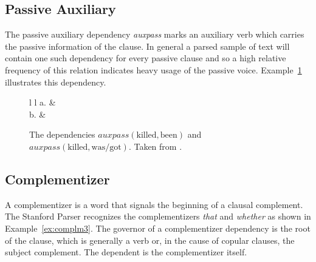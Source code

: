 \documentclass[main.tex]{subfiles}
\begin{document}
\subsection{Passive Auxiliary}

The passive auxiliary dependency \textit{auxpass} marks an auxiliary verb which carries the passive information of the clause. In general a parsed sample of text will contain one such dependency for every passive clause and so a high relative frequency of this relation indicates heavy usage of the passive voice. Example~\ref{ex:auxpass-dep} illustrates this dependency.

\begin{figure}
\caption{The dependencies $auxpass(\text{killed},\text{been})$ and $auxpass(\text{killed},\text{was/got})$. Taken from \citet{typed-deps-manual}.}

\centering
\begin{tabular}{ l l }
a. & \\
b. & 
\end{tabular}
\label{ex:auxpass-dep}
\end{figure}


\subsection{Complementizer}

A complementizer is a word that signals the beginning of a clausal complement. The Stanford Parser recognizes the complementizers \textit{that} and \textit{whether} as shown in Example~\ref{ex:complm3}. The governor of a complementizer dependency is the root of the clause, which is generally a verb or, in the cause of copular clauses, the subject complement. The dependent is the complementizer itself.
\end{document}
